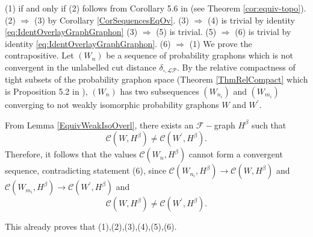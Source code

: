 \documentclass[11pt]{article}
\newcommand{\cF}{{\mathcal F}}  %
\begin{document}
(1) if and only if (2) follows from Corollary 5.6 in \cite{abraham2023probabilitygraphons} (see Theorem \ref{cor:equiv-topo}). \newline
(2) $\Rightarrow$ (3) by Corollary \ref{CorSequencesEqOv}. \newline
(3) $\Rightarrow$ (4) is trivial by identity \eqref{eq:IdentOverlayGraphGraphon}\newline
(3) $\Rightarrow$ (5) is trivial.\newline
(5) $\Rightarrow$ (6) is trivial by identity \eqref{eq:IdentOverlayGraphGraphon}.\newline
(6) $\Rightarrow$ (1) We prove the contrapositive. Let $\left(W_n\right)$ be a sequence of probability graphons which is not convergent in the unlabelled cut distance $\delta_{\square,\mathcal{LP}}$. By the relative compactness of tight subsets of the probability graphon space (Theorem \ref{ThmRelCompact} which is Proposition 5.2 in \cite{abraham2023probabilitygraphons}), $\left(W_n\right)$ has two subsequences $\left(W_{n_i}\right)$ and $\left(W_{m_i}\right)$ converging to not weakly isomorphic probability graphons $W$ and $W^{\prime}$. 

From Lemma \ref{EquivWeakIsoOverl}, there exists an $\cF-$graph $H^{\beta}$ such that
$$
\mathcal{C}\left(W, H^{\beta}\right)\neq \mathcal{C}\left(W^{\prime}, H^{\beta}\right).$$
Therefore, it follows that the values $\mathcal{C}\left(W_n, H^{\beta}\right)$ cannot form a convergent sequence, contradicting statement (6), since $\mathcal{C}\left(W_{n_i}, H^{\beta}\right) \rightarrow \mathcal{C}(W, H^{\beta})$ and $\mathcal{C}\left(W_{m_i}, H^{\beta}\right) \rightarrow \mathcal{C}\left(W^{\prime}, H^{\beta}\right)$ and $$
\mathcal{C}\left(W, H^{\beta}\right)\neq \mathcal{C}\left(W^{\prime}, H^{\beta}\right).
$$\newline

This already proves that (1),(2),(3),(4),(5),(6).\newline
\end{document}
